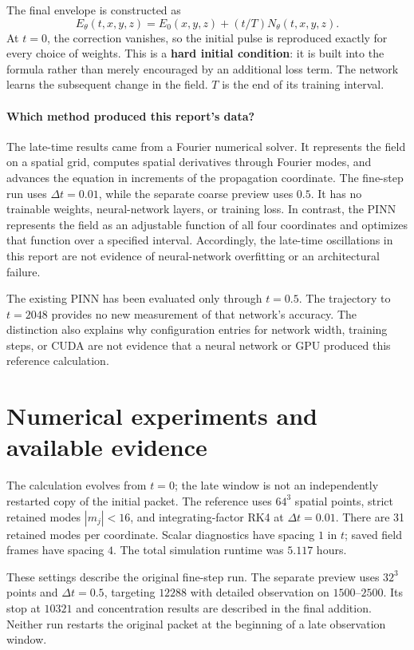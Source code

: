 \documentclass[10pt]{article}
\begin{document}
The final envelope is constructed as
\[
E_\theta(t,x,y,z)=E_0(x,y,z)+(t/T)N_\theta(t,x,y,z).
\]
At $t=0$, the correction vanishes, so the initial pulse is reproduced exactly for every choice of weights. This is a \textbf{hard initial condition}: it is built into the formula rather than merely encouraged by an additional loss term. The network learns the subsequent change in the field. $T$ is the end of its training interval.

\paragraph{Which method produced this report's data?}
The late-time results came from a Fourier numerical solver. It represents the field on a spatial grid, computes spatial derivatives through Fourier modes, and advances the equation in increments of the propagation coordinate. The fine-step run uses $\Delta t=0.01$, while the separate coarse preview uses $0.5$. It has no trainable weights, neural-network layers, or training loss. In contrast, the PINN represents the field as an adjustable function of all four coordinates and optimizes that function over a specified interval. Accordingly, the late-time oscillations in this report are not evidence of neural-network overfitting or an architectural failure.

The existing PINN has been evaluated only through $t=0.5$. The trajectory to $t=2048$ provides no new measurement of that network's accuracy. The distinction also explains why configuration entries for network width, training steps, or CUDA are not evidence that a neural network or GPU produced this reference calculation.
\clearpage
\section{Numerical experiments and available evidence}
The calculation evolves from $t=0$; the late window is not an independently restarted copy of the initial packet. The reference uses $64^3$ spatial points, strict retained modes $|m_j|<16$, and integrating-factor RK4 at $\Delta t=0.01$. There are 31 retained modes per coordinate. Scalar diagnostics have spacing $1$ in $t$; saved field frames have spacing $4$. The total simulation runtime was $5.117$ hours.

These settings describe the original fine-step run. The separate preview uses $32^3$ points and $\Delta t=0.5$, targeting $12288$ with detailed observation on $1500$--$2500$. Its stop at $10321$ and concentration results are described in the final addition. Neither run restarts the original packet at the beginning of a late observation window.
\end{document}
